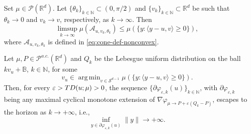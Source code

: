 \documentclass[10pt,a4paper]{amsart}
\newcommand{\N}{\mathbb{N}}
\newcommand{\R}{\mathbb{R}}
\DeclareMathOperator*{\argmin}{arg\,min}
\newcommand{\eps}{\varepsilon}
\begin{document}
\begin{lemma}\label{lemma:ConvergenceToOneHalph}
  Set $\mu\in \mathcal{P}(\R^d)$.  Let $\{\theta_k\}_{k\in \N}\subset (0,\pi/2)$ and $\{v_k\}_{k\in \N}\subset \mathbb{R}^d$ be such that  $ \theta_k\to 0$ and $ v_k\to v$, respectively, as $k\to \infty$. Then
$$ \limsup_{k\to \infty} \mu(\mathcal{A}_{u,v_k, \theta_k}) \leq \mu(\{ y: 
      \langle  y-u, v\rangle\geq 
0  \} ), $$
 {where $\mathcal{A}_{u,v_k, \theta_k}$ is defined in \eqref{eq:cone-def-nonconvex}.}
\end{lemma}

\begin{lemma}\label{lemma:LowerCont}
Let $\mu,P\in \mathcal{P}^{a.c.}(\R^d)$ and $Q_k$ be the Lebesgue uniform distribution on the ball $k v_u+\mathbb{B}$, $k\in \N$, for some 
 $$v_u\in \argmin_{v\in \mathcal{S}^{d-1}} \mu(\{ y: 
      \langle  y-u, v\rangle\geq 
0  \} ).$$
Then, for every $\eps>{\rm TD}(u;\mu)>0$, the sequence $\{\partial \varphi_{\eps,k}(u)\}_{k\in \N}$, with  
 $\partial \varphi_{\eps,k} $  being any maximal {  cyclical} monotone extension of $\nabla \varphi_{\mu\to P+\eps (Q_k-P)}$, escapes to the horizon as $k\to +\infty$, i.e.,   
    $$\inf_{y\in \partial \varphi_{\eps,k}(u)}\|y\|\to +\infty.$$
\end{lemma}
\end{document}
